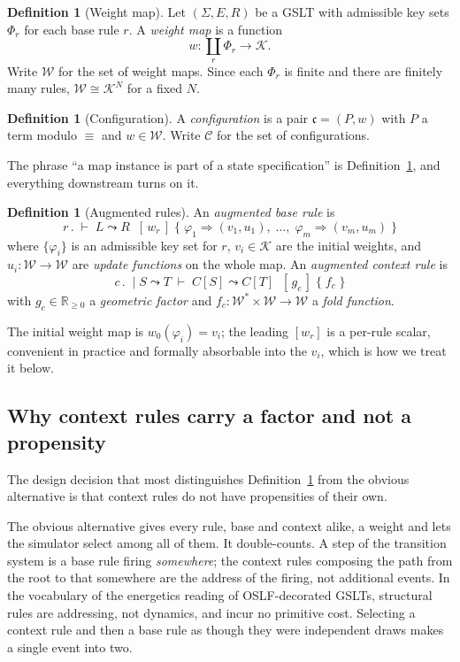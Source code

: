 \documentclass[11pt,a4paper]{article}
\theoremstyle{plain}
\theoremstyle{definition}
\newtheorem{definition}[theorem]{Definition}
\theoremstyle{remark}
\newcommand{\Rnn}{\mathbb{R}_{\geq 0}}
\newcommand{\Cfg}{\mathcal{C}}
\newcommand{\Wt}{\mathcal{W}}
\newcommand{\wmap}{w}
\newcommand{\gfac}{g}
\begin{document}
\begin{definition}[Weight map]
\label{def:wmap}
Let $(\Sigma, E, R)$ be a GSLT with admissible key sets $\Phi_r$ for each base rule $r$. A
\emph{weight map} is a function
\[
\wmap : \textstyle\coprod_{r} \Phi_r \longrightarrow \mathcal{K}.
\]
Write $\Wt$ for the set of weight maps. Since each $\Phi_r$ is finite and there are finitely many
rules, $\Wt \cong \mathcal{K}^N$ for a fixed $N$.
\end{definition}

\begin{definition}[Configuration]
\label{def:config}
A \emph{configuration} is a pair $\mathfrak{c} = (P, \wmap)$ with $P$ a term modulo $\equiv$ and
$\wmap \in \Wt$. Write $\Cfg$ for the set of configurations.
\end{definition}

The phrase ``a map instance is part of a state specification'' is Definition~\ref{def:config}, and
everything downstream turns on it.

\begin{definition}[Augmented rules]
\label{def:augmented}
An \emph{augmented base rule} is
\[
r \,.\; \vdash\; L \leadsto R \;\; [\,\wmap_r\,]
\;\{\; \varphi_1 \Rightarrow (v_1, u_1), \;\ldots,\; \varphi_m \Rightarrow (v_m, u_m) \;\}
\]
where $\{\varphi_i\}$ is an admissible key set for $r$, $v_i \in \mathcal{K}$ are the initial
weights, and $u_i : \Wt \to \Wt$ are \emph{update functions} on the whole map. An \emph{augmented
context rule} is
\[
c \,.\; \mid S \leadsto T \;\vdash\; C[S] \leadsto C[T] \;\; [\,\gfac_c\,] \;\{\; f_c \;\}
\]
with $\gfac_c \in \Rnn$ a \emph{geometric factor} and $f_c : \Wt^* \times \Wt \to \Wt$ a
\emph{fold function}.
\end{definition}

The initial weight map is $\wmap_0(\varphi_i) = v_i$; the leading $[\wmap_r]$ is a per-rule scalar,
convenient in practice and formally absorbable into the $v_i$, which is how we treat it below.

\subsection{Why context rules carry a factor and not a propensity}
\label{sec:geometric}

The design decision that most distinguishes Definition~\ref{def:augmented} from the obvious
alternative is that context rules do not have propensities of their own.

The obvious alternative gives every rule, base and context alike, a weight and lets the simulator
select among all of them. It double-counts. A step of the transition system is a base rule firing
\emph{somewhere}; the context rules composing the path from the root to that somewhere are the
address of the firing, not additional events. In the vocabulary of the energetics reading of
OSLF-decorated GSLTs, structural rules are addressing, not dynamics, and incur no primitive cost.
Selecting a context rule and then a base rule as though they were independent draws makes a single
event into two.
\end{document}
